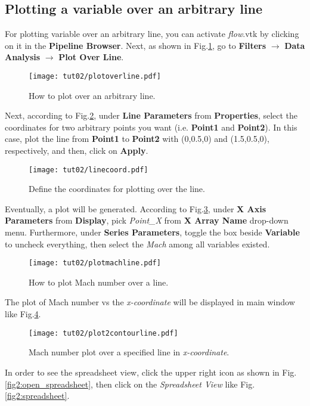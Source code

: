 \subsection{Plotting a variable over an arbitrary line}
For plotting variable over an arbitrary line, you can activate \textit{flow}.vtk by clicking on it in the \textbf{Pipeline Browser}. Next, as shown in Fig.\ref{fig2:plot_over_line}, go to \textbf{Filters} $\rightarrow$  \textbf{Data Analysis} $\rightarrow$  \textbf{Plot Over Line}.
\begin{figure}[htbp]
    \centering
    \texttt{[image: tut02/plotoverline.pdf]}
    \caption{How to plot over an arbitrary line.}
    \label{fig2:plot_over_line}
\end{figure}
Next, according to Fig.\ref{fig2:line_coordinate}, under \textbf{Line Parameters} from \textbf{Properties}, select the coordinates for two arbitrary points you want (i.e. \textbf{Point1} and \textbf{Point2}). In this case, plot the line from \textbf{Point1} to \textbf{Point2} with (0,0.5,0) and (1.5,0.5,0), respectively, and then, click on \textbf{Apply}.
\begin{figure}[htbp]
    \centering
    \texttt{[image: tut02/linecoord.pdf]}
    \caption{Define the coordinates for plotting over the line.}
    \label{fig2:line_coordinate}
\end{figure}
Eventually, a plot will be generated. According to Fig.\ref{fig2:plot_line_setting}, under \textbf{X Axis Parameters} from \textbf{Display}, pick \textit{Point\_X} from \textbf{X Array Name} drop-down menu. Furthermore, under \textbf{Series Parameters}, toggle the box beside \textbf{Variable} to uncheck everything, then select the \textit{Mach} among all variables existed.
\begin{figure}[htbp]
    \centering
    \texttt{[image: tut02/plotmachline.pdf]}
    \caption{How to plot Mach number over a line.}
    \label{fig2:plot_line_setting}
\end{figure}
The plot of Mach number vs the \textit{x-coordinate} will be displayed in main window like Fig.\ref{fig2:plot_line}.
\begin{figure}[htbp]
    \centering
    \texttt{[image: tut02/plot2contourline.pdf]}
    \caption{Mach number plot over a specified line in \textit{x-coordinate}.}
    \label{fig2:plot_line}
\end{figure}
In order to see the spreadsheet view, click the upper right icon as shown in Fig.\ref{fig2:open_spreadsheet}, then click on the \textit{Spreadsheet View} like Fig.\ref{fig2:spreadsheet}.
